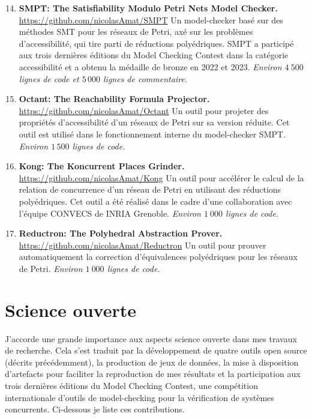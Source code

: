 \begin{enumerate}
  \setcounter{enumi}{13}
  \item \textbf{SMPT: The Satisfiability Modulo Petri Nets Model Checker.}
  \smallbreak
  \url{https://github.com/nicolasAmat/SMPT}
  \smallbreak
  Un model-checker basé sur des méthodes SMT pour les réseaux de Petri, axé sur
  les problèmes d'accessibilité, qui tire parti de réductions polyédriques.
  \textsf{SMPT} a participé aux trois dernières éditions du Model Checking
  Contest dans la catégorie \og accessibilité \fg et a obtenu la médaille de bronze
  en 2022 et 2023.
  \smallbreak
  \emph{Environ $4\ 500$ lignes de code et $5\, 000$ lignes de commentaire.}
  \smallbreak
  \item \textbf{Octant: The Reachability Formula Projector.}
  \smallbreak
  \url{https://github.com/nicolasAmat/Octant}
  \smallbreak
  Un outil pour projeter des propriétés d'accessibilité d'un réseaux de Petri
  sur sa version réduite. Cet outil est utilisé dans le fonctionnement interne
  du model-checker \textsf{SMPT}.
  \smallbreak
  \emph{Environ $1\,500$ lignes de code.}
  \smallbreak

  \item \textbf{Kong: The Koncurrent Places Grinder.}
  \smallbreak
  \url{https://github.com/nicolasAmat/Kong}
  \smallbreak
  Un outil pour accélérer le calcul de la relation de concurrence d'un réseau de
  Petri en utilisant des réductions polyédriques. Cet outil a été réalisé dans
  le cadre d'une collaboration avec l'équipe CONVECS de INRIA Grenoble.
  \smallbreak
  \emph{Environ $1\ 000$ lignes de code.}
  \newpage
  \item \textbf{Reductron: The Polyhedral Abstraction Prover.}
  \smallbreak
  \url{https://github.com/nicolasAmat/Reductron}
  \smallbreak
  Un outil pour prouver automatiquement la correction d'équivalences
  polyédriques pour les réseaux de Petri.
  \smallbreak
  \emph{Environ $1\ 000$ lignes de code.}
\end{enumerate}
\vspace{10pt}



\section*{Science ouverte}
\vspace{10pt}
J'accorde une grande importance aux aspects \og science ouverte \fg dans mes travaux
de recherche. Cela s'est traduit par la développement de quatre outils open
source (décrits précédemment), la production de jeux de données, la mise à
disposition d'artefacts pour faciliter la reproduction de mes résultats et la
participation aux trois dernières éditions du Model Checking Contest, une
compétition internationale d'outils de model-checking pour la vérification de
systèmes concurrents. Ci-dessous je liste ces contributions.

